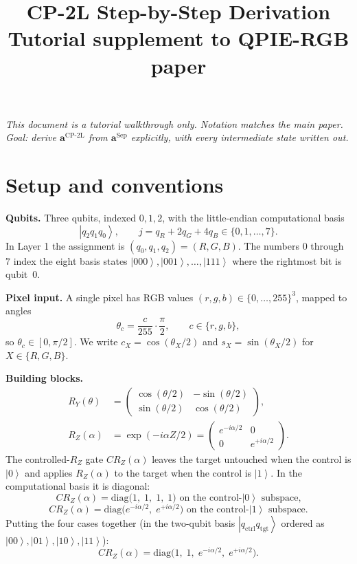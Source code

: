 \documentclass[11pt]{article}
\title{CP-2L Step-by-Step Derivation\\\large Tutorial supplement to QPIE-RGB paper}
\author{}
\date{}
\newcommand{\ket}[1]{\left| #1 \right\rangle}
\begin{document}
\maketitle

\noindent\emph{This document is a tutorial walkthrough only. Notation matches the main paper. Goal: derive $\mathbf{a}^\text{CP-2L}$ from $\mathbf{a}^\text{Sep}$ explicitly, with every intermediate state written out.}

\section{Setup and conventions}

\textbf{Qubits.} Three qubits, indexed $0, 1, 2$, with the little-endian computational basis
\[
\ket{q_2 q_1 q_0}, \qquad j = q_R + 2 q_G + 4 q_B \in \{0, 1, \ldots, 7\}.
\]
In Layer 1 the assignment is $(q_0, q_1, q_2) = (R, G, B)$. The numbers $0$ through $7$ index the eight basis states $\ket{000}, \ket{001}, \ldots, \ket{111}$ where the rightmost bit is qubit~0.

\textbf{Pixel input.} A single pixel has RGB values $(r, g, b) \in \{0, \ldots, 255\}^3$, mapped to angles
\[
\theta_c = \frac{c}{255} \cdot \frac{\pi}{2}, \qquad c \in \{r, g, b\},
\]
so $\theta_c \in [0, \pi/2]$. We write $c_X = \cos(\theta_X/2)$ and $s_X = \sin(\theta_X/2)$ for $X \in \{R, G, B\}$.

\textbf{Building blocks.}
\begin{align}
R_Y(\theta) &= \begin{pmatrix} \cos(\theta/2) & -\sin(\theta/2) \\ \sin(\theta/2) & \cos(\theta/2) \end{pmatrix}, \\
R_Z(\alpha) &= \exp(-i \alpha Z / 2) = \begin{pmatrix} e^{-i\alpha/2} & 0 \\ 0 & e^{+i\alpha/2} \end{pmatrix}.
\end{align}
The controlled-$R_Z$ gate $CR_Z(\alpha)$ leaves the target untouched when the control is $\ket{0}$ and applies $R_Z(\alpha)$ to the target when the control is $\ket{1}$. In the computational basis it is diagonal:
\[
CR_Z(\alpha) = \mathrm{diag}\bigl(1,\; 1,\; 1,\; 1\bigr) \text{ on the control-}\ket{0}\text{ subspace,}
\]
\[
CR_Z(\alpha) = \mathrm{diag}\bigl(e^{-i\alpha/2},\; e^{+i\alpha/2}\bigr) \text{ on the control-}\ket{1}\text{ subspace.}
\]
Putting the four cases together (in the two-qubit basis $\ket{q_\text{ctrl} q_\text{tgt}}$ ordered as $\ket{00}, \ket{01}, \ket{10}, \ket{11}$):
\[
CR_Z(\alpha) = \mathrm{diag}\bigl(1,\; 1,\; e^{-i\alpha/2},\; e^{+i\alpha/2}\bigr).
\]
\end{document}
